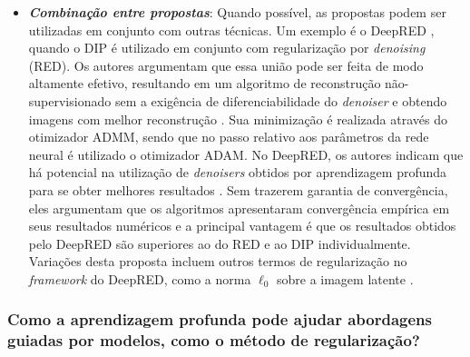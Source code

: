 \begin{itemize}
\item \textbf{\textit{Combinação entre propostas}}: Quando possível, as propostas podem ser utilizadas em conjunto com outras técnicas. Um exemplo é o DeepRED \cite{Mataev_2019_ICCV}, quando o DIP é utilizado em conjunto com regularização por \textit{denoising} (RED). Os autores argumentam que essa união pode ser feita de modo altamente efetivo, resultando em um algoritmo de reconstrução não-supervisionado sem a exigência de diferenciabilidade do \textit{denoiser} e obtendo imagens com melhor reconstrução \cite{Mataev_2019_ICCV}. Sua minimização é realizada através do otimizador ADMM, sendo que no passo relativo aos parâmetros da rede neural  é utilizado o otimizador ADAM.  No DeepRED, os autores indicam que há potencial na utilização de \textit{denoisers} obtidos por aprendizagem profunda para se obter melhores resultados \cite{Mataev_2019_ICCV}. Sem trazerem garantia de convergência, eles argumentam que os algoritmos apresentaram convergência empírica em seus resultados numéricos e a principal vantagem é que os resultados obtidos pelo DeepRED são superiores ao do RED e ao DIP individualmente.  Variações desta proposta incluem outros termos de regularização no \textit{framework} do DeepRED, como a norma $\ell_0$ sobre a imagem latente \cite{Feng2020}.



\end{itemize}

\subsubsection{Como a aprendizagem profunda pode ajudar abordagens guiadas por modelos, como o método de regularização?}\label{sec:deepreg}


